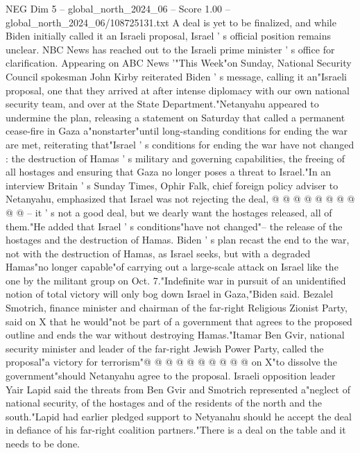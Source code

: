 \begin{textsample}{NEG Dim 5 – global\_north\_2024\_06 – Score 1.00 – global\_north\_2024\_06/108725131.txt}  \label{ex:f5_neg_135}
A deal is yet to be finalized, and while Biden initially called it an Israeli proposal, Israel ' s official position remains unclear.
NBC News has reached out to the Israeli prime minister ' s office for clarification.
Appearing on ABC News '"This Week"on Sunday, National Security Council spokesman John Kirby reiterated Biden ' s message, calling it an"Israeli proposal, one that they arrived at after intense diplomacy with our own national security team, and over at the State Department."Netanyahu appeared to undermine the plan, releasing a statement on Saturday that called a permanent cease-fire in Gaza a"nonstarter"until long-standing conditions for ending the war are met, reiterating that"Israel ' s conditions for ending the war have not changed : the destruction of Hamas ' s military and governing capabilities, the freeing of all hostages and ensuring that Gaza no longer poses a threat to Israel."In an interview Britain ' s Sunday Times, Ophir Falk, chief foreign policy adviser to Netanyahu, emphasized that Israel was not rejecting the deal, @ @ @ @ @ @ @ @ @ @ -- it ' s not a good deal, but we dearly want the hostages released, all of them."He added that Israel ' s conditions"have not changed"-- the release of the hostages and the destruction of Hamas.
Biden ' s plan recast the end to the war, not with the destruction of Hamas, as Israel seeks, but with a degraded Hamas"no longer capable"of carrying out a large-scale attack on Israel like the one by the militant group on Oct. 7."Indefinite war in pursuit of an unidentified notion of total victory will only bog down Israel in Gaza,"Biden said.
Bezalel Smotrich, finance minister and chairman of the far-right Religious Zionist Party, said on X that he would"not be part of a government that agrees to the proposed outline and ends the war without destroying Hamas."Itamar Ben Gvir, national security minister and leader of the far-right Jewish Power Party, called the proposal"a victory for terrorism"@ @ @ @ @ @ @ @ @ @ on X"to dissolve the government"should Netanyahu agree to the proposal.
Israeli opposition leader Yair Lapid said the threats from Ben Gvir and Smotrich represented a"neglect of national security, of the hostages and of the residents of the north and the south."Lapid had earlier pledged support to Netyanahu should he accept the deal in defiance of his far-right coalition partners."There is a deal on the table and it needs to be done.

\end{textsample}
